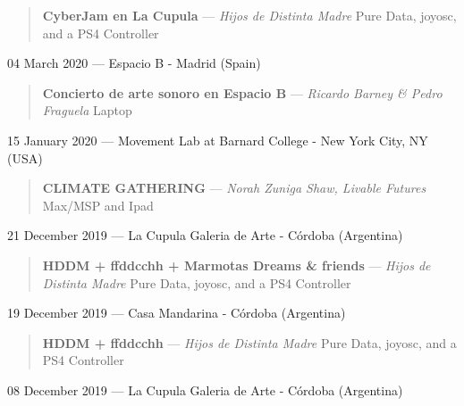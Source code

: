 \documentclass[12pt,overlapped]{res}%
\begin{document}
\begin{resume}
\begin{quote}
\par
\textbf{CyberJam en La Cupula} --- \textit{Hijos de Distinta Madre}
Pure Data, joyosc, and a PS4 Controller
\end{quote}%
%
%
%
04 March 2020 --- Espacio B - Madrid (Spain)%
\begin{quote}
\par
\textbf{Concierto de arte sonoro en Espacio B} --- \textit{Ricardo Barney \& Pedro Fraguela}
Laptop
\end{quote}%
%
%
%
15 January 2020 --- Movement Lab at Barnard College - New York City, NY (USA)%
\begin{quote}
\par
\textbf{CLIMATE GATHERING} --- \textit{Norah Zuniga Shaw, Livable Futures}
Max/MSP and Ipad
\end{quote}%
%
%
%
21 December 2019 --- La Cupula Galeria de Arte - Córdoba (Argentina)%
\begin{quote}
\par
\textbf{HDDM + ffddcchh + Marmotas Dreams \& friends} --- \textit{Hijos de Distinta Madre}
Pure Data, joyosc, and a PS4 Controller
\end{quote}%
%
%
%
19 December 2019 --- Casa Mandarina - Córdoba (Argentina)%
\begin{quote}
\par
\textbf{HDDM + ffddcchh} --- \textit{Hijos de Distinta Madre}
Pure Data, joyosc, and a PS4 Controller
\end{quote}%
%
%
%
08 December 2019 --- La Cupula Galeria de Arte - Córdoba (Argentina)%
\begin{quote}

\end{quote}
\end{resume}
\end{document}
